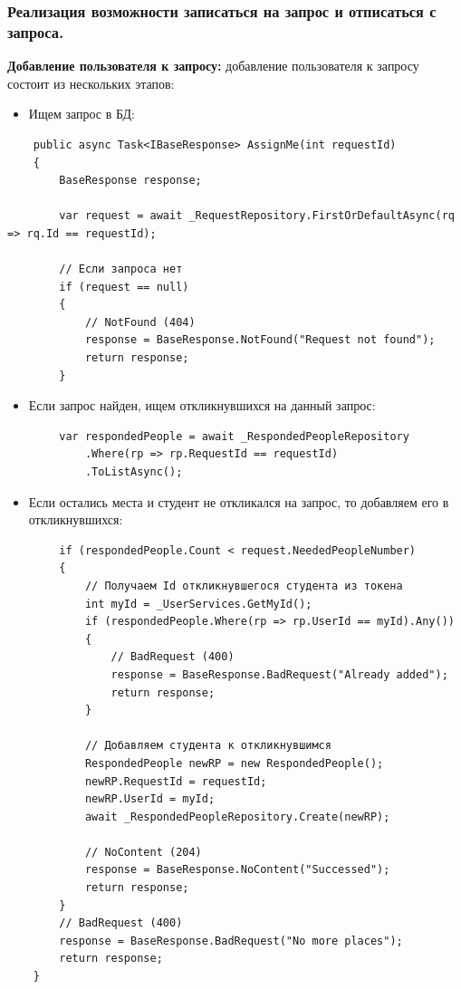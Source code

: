 \subsubsection{Реализация возможности записаться на запрос и отписаться с запроса.}

\textbf{Добавление пользователя к запросу:} добавление пользователя к запросу состоит из нескольких этапов:
\begin{itemize}
	\item{Ищем запрос в БД:}
\end{itemize}
\begin{verbatim}
    public async Task<IBaseResponse> AssignMe(int requestId)
    {
        BaseResponse response;

        var request = await _RequestRepository.FirstOrDefaultAsync(rq => rq.Id == requestId);

        // Если запроса нет
        if (request == null)
        {
            // NotFound (404)
            response = BaseResponse.NotFound("Request not found");
            return response;
        }

\end{verbatim}

\begin{itemize}
	\item{Если запрос найден, ищем откликнувшихся на данный запрос:}
\end{itemize}
\begin{verbatim}
        var respondedPeople = await _RespondedPeopleRepository
            .Where(rp => rp.RequestId == requestId)
            .ToListAsync();
\end{verbatim}

\begin{itemize}
	\item{Если остались места и студент не откликался на запрос, то добавляем его в откликнувшихся:}
\end{itemize}
\begin{verbatim}
        if (respondedPeople.Count < request.NeededPeopleNumber)
        {
            // Получаем Id откликнувшегося студента из токена
            int myId = _UserServices.GetMyId();
            if (respondedPeople.Where(rp => rp.UserId == myId).Any())
            {
                // BadRequest (400)
                response = BaseResponse.BadRequest("Already added");
                return response;
            }

            // Добавляем студента к откликнувшимся
            RespondedPeople newRP = new RespondedPeople();
            newRP.RequestId = requestId;
            newRP.UserId = myId;
            await _RespondedPeopleRepository.Create(newRP);

            // NoContent (204)
            response = BaseResponse.NoContent("Successed");
            return response;
        }
        // BadRequest (400)
        response = BaseResponse.BadRequest("No more places");
        return response;
    }
\end{verbatim}


